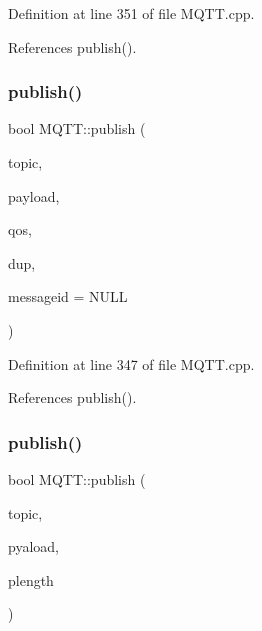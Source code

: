 Definition at line 351 of file M\+Q\+T\+T.\+cpp.



References publish().

\mbox{\label{class_m_q_t_t_abd5a453777652cd30ae3cfc4df4aa376}} 
\subsubsection{\texorpdfstring{publish()}{publish()}\hspace{0.1cm}{\footnotesize\ttfamily [4/10]}}
{\footnotesize\ttfamily bool M\+Q\+T\+T\+::publish (\begin{DoxyParamCaption}\item[{const char $\ast$}]{topic,  }\item[{const char $\ast$}]{payload,  }\item[{\hyperlink{class_m_q_t_t_aff501e08e20ebf26b3272fcc0e7215ff}{E\+M\+Q\+T\+T\+\_\+\+Q\+OS}}]{qos,  }\item[{bool}]{dup,  }\item[{uint16\+\_\+t $\ast$}]{messageid = {\ttfamily NULL} }\end{DoxyParamCaption})}



Definition at line 347 of file M\+Q\+T\+T.\+cpp.



References publish().

\mbox{\label{class_m_q_t_t_a6a5dd9b7c19f2892802a222ec5d610b5}} 
\subsubsection{\texorpdfstring{publish()}{publish()}\hspace{0.1cm}{\footnotesize\ttfamily [5/10]}}
{\footnotesize\ttfamily bool M\+Q\+T\+T\+::publish (\begin{DoxyParamCaption}\item[{const char $\ast$}]{topic,  }\item[{const uint8\+\_\+t $\ast$}]{pyaload,  }\item[{unsigned int}]{plength }\end{DoxyParamCaption})}



